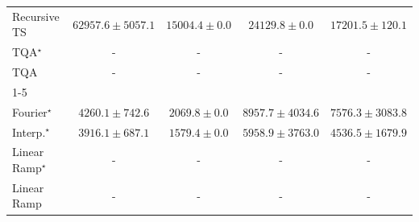 \begin{tabular}{l|cccc|}
Recursive TS & {\cellcolor[HTML]{036B38}} \color[HTML]{F1F1F1} $62957.6\pm 5057.1$ & {\cellcolor[HTML]{FDFED9}} \color[HTML]{000000} $15004.4\pm 0.0$ & {\cellcolor[HTML]{E7F6AD}} \color[HTML]{000000} $24129.8\pm 0.0$ & {\cellcolor[HTML]{FAFDCC}} \color[HTML]{000000} $17201.5\pm 120.1$ \\
TQA$^\star$ & {\cellcolor[HTML]{000000}} \color[HTML]{F1F1F1} {\cellcolor{white}} \color{black} - & {\cellcolor[HTML]{000000}} \color[HTML]{F1F1F1} {\cellcolor{white}} \color{black} - & {\cellcolor[HTML]{000000}} \color[HTML]{F1F1F1} {\cellcolor{white}} \color{black} - & {\cellcolor[HTML]{000000}} \color[HTML]{F1F1F1} {\cellcolor{white}} \color{black} - \\
TQA & {\cellcolor[HTML]{000000}} \color[HTML]{F1F1F1} {\cellcolor{white}} \color{black} - & {\cellcolor[HTML]{000000}} \color[HTML]{F1F1F1} {\cellcolor{white}} \color{black} - & {\cellcolor[HTML]{000000}} \color[HTML]{F1F1F1} {\cellcolor{white}} \color{black} - & {\cellcolor[HTML]{000000}} \color[HTML]{F1F1F1} {\cellcolor{white}} \color{black} - \\
\cline{1-5}
\multicolumn{5}{c}{\rule{0pt}{8pt}SV} \\
\midrule
Fourier$^\star$ & {\cellcolor[HTML]{A9BFDC}} \color[HTML]{000000} $4260.1\pm 742.6$ & {\cellcolor[HTML]{F5EEF6}} \color[HTML]{000000} $2069.8\pm 0.0$ & {\cellcolor[HTML]{023858}} \color[HTML]{F1F1F1} $8957.7\pm 4034.6$ & {\cellcolor[HTML]{04649E}} \color[HTML]{F1F1F1} $7576.3\pm 3083.8$ \\
Interp.$^\star$ & {\cellcolor[HTML]{B9C6E0}} \color[HTML]{000000} $3916.1\pm 687.1$ & {\cellcolor[HTML]{FFF7FB}} \color[HTML]{000000} $1579.4\pm 0.0$ & {\cellcolor[HTML]{4697C4}} \color[HTML]{F1F1F1} $5958.9\pm 3763.0$ & {\cellcolor[HTML]{9CB9D9}} \color[HTML]{000000} $4536.5\pm 1679.9$ \\
Linear Ramp$^\star$ & {\cellcolor[HTML]{000000}} \color[HTML]{F1F1F1} {\cellcolor{white}} \color{black} - & {\cellcolor[HTML]{000000}} \color[HTML]{F1F1F1} {\cellcolor{white}} \color{black} - & {\cellcolor[HTML]{000000}} \color[HTML]{F1F1F1} {\cellcolor{white}} \color{black} - & {\cellcolor[HTML]{000000}} \color[HTML]{F1F1F1} {\cellcolor{white}} \color{black} - \\
Linear Ramp & {\cellcolor[HTML]{000000}} \color[HTML]{F1F1F1} {\cellcolor{white}} \color{black} - & {\cellcolor[HTML]{000000}} \color[HTML]{F1F1F1} {\cellcolor{white}} \color{black} - & {\cellcolor[HTML]{000000}} \color[HTML]{F1F1F1} {\cellcolor{white}} \color{black} - & {\cellcolor[HTML]{000000}} \color[HTML]{F1F1F1} {\cellcolor{white}} \color{black} - \\

\end{tabular}
